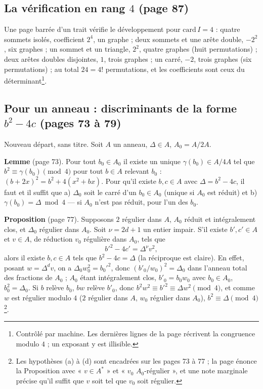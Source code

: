 \documentclass[11pt,a4paper]{article}
\begin{document}
\subsection*{La vérification en rang $4$ (page 87)}

Une page barrée d'un trait vérifie le développement pour $\mathrm{card}\,I = 4$ :
quatre sommets isolés, coefficient $2^4$, un graphe ; deux sommets et une arête
double, $-2^2$, six graphes ; un sommet et un triangle, $2^2$, quatre graphes (huit
permutations) ; deux arêtes doubles disjointes, $1$, trois graphes ; un carré,
$-2$, trois graphes (six permutations) ; au total $24 = 4!$ permutations, et les
coefficients sont ceux du déterminant\footnote{Contrôlé par machine. Les dernières
lignes de la page récrivent la congruence modulo $4$ ; un exposant y est illisible.}.

\subsection*{Pour un anneau : discriminants de la forme $b^2 - 4c$ (pages 73 à 79)}

Nouveau départ, sans titre. Soit $A$ un anneau, $\Delta \in A$, $A_0 = A/2A$.

\textbf{Lemme} (page 73). Pour tout $b_0 \in A_0$ il existe un unique $\gamma(b_0) \in
A/4A$ tel que $b^2 \equiv \gamma(b_0) \pmod 4$ pour tout $b \in A$ relevant $b_0$ :
$(b + 2x)^2 = b^2 + 4(x^2 + bx)$. Pour qu'il existe $b, c \in A$ avec $\Delta = b^2 -
4c$, il faut et il suffit que a) $\Delta_0$ soit le carré d'un $b_0 \in A_0$ (unique si
$A_0$ est réduit) et b) $\gamma(b_0) = \Delta \bmod 4$ — si $A_0$ n'est pas réduit,
pour l'un des $b_0$.

\textbf{Proposition} (page 77). Supposons $2$ régulier dans $A$, $A_0$ réduit et
intégralement clos, et $\Delta_0$ régulier dans $A_0$. Soit $\nu = 2d + 1$ un entier
impair. S'il existe $b', c' \in A$ et $v \in A$, de réduction $v_0$ régulière dans
$A_0$, tels que
\[
  b'^2 - 4c' = \Delta^\nu v^2,
\]
alors il existe $b, c \in A$ tels que $b^2 - 4c = \Delta$ (la réciproque est claire).
En effet, posant $w = \Delta^d v$, on a $\Delta_0 w_0^2 = b_0'^2$, donc
$(b'_0/w_0)^2 = \Delta_0$ dans l'anneau total des fractions de $A_0$ ; $A_0$ étant
intégralement clos, $b'_0 = b_0 w_0$ avec $b_0 \in A_0$, $b_0^2 = \Delta_0$. Si $b$
relève $b_0$, $bw$ relève $b'_0$, donc $b^2w^2 \equiv b'^2 \equiv \Delta w^2 \pmod
4$, et comme $w$ est régulier modulo $4$ ($2$ régulier dans $A$, $w_0$ régulier dans
$A_0$), $b^2 \equiv \Delta \pmod 4$\footnote{Les hypothèses (a) à (d) sont encadrées
sur les pages 73 à 77 ; la page énonce la Proposition avec « $v \in A^{*}$ » et
« $v_0$ $A_0$-régulier », et une note marginale précise qu'il suffit que $v$ soit tel
que $v_0$ soit régulier.}.
\end{document}
